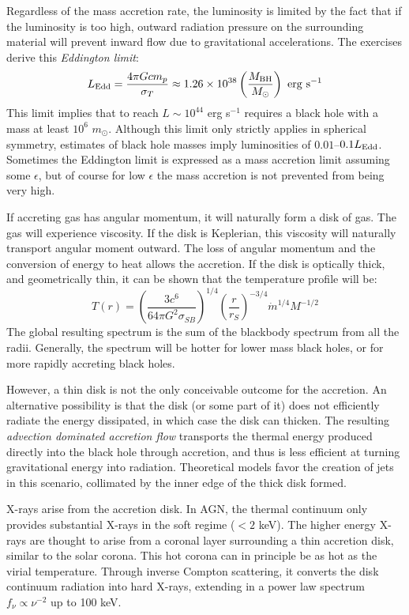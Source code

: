 Regardless of the mass accretion rate, the luminosity is limited by
the fact that if the luminosity is too high, outward radiation
pressure on the surrounding material will prevent inward flow due to
gravitational accelerations. The exercises derive this {\it Eddington
  limit}:
\begin{equation}
L_{\rm Edd} = \frac{4\pi G c m_p}{\sigma_T} \approx 1.26 \times
10^{38} \left(\frac{M_{\rm BH}}{M_\odot}\right) \mathrm{~erg~s}^{-1}
\end{equation}
This limit implies that to reach $L\sim 10^{44}$ erg s$^{-1}$ requires
a black hole with a mass at least $10^6$ $m_\odot$. Although this
limit only strictly applies in spherical symmetry, estimates of black
hole masses imply luminosities of $0.01$--$0.1 L_{\rm Edd}$. Sometimes
the Eddington limit is expressed as a mass accretion limit assuming
some $\epsilon$, but of course for low $\epsilon$ the mass accretion
is not prevented from being very high.

If accreting gas has angular momentum, it will naturally form a disk
of gas. The gas will experience viscosity. If the disk is Keplerian,
this viscosity will naturally transport angular moment outward. The
loss of angular momentum and the conversion of energy to heat allows
the accretion. If the disk is optically thick, and geometrically thin,
it can be shown that the temperature profile will be:
\begin{equation}
  T(r) = \left(\frac{3 c^6}{64\pi G^2 \sigma_{SB}}\right)^{1/4}
    \left(\frac{r}{r_S}\right)^{-3/4} {\dot m}^{1/4} M^{-1/2}
\end{equation}
The global resulting spectrum is the sum of the blackbody spectrum
from all the radii. Generally, the spectrum will be hotter for lower
mass black holes, or for more rapidly accreting black holes.

However, a thin disk is not the only conceivable outcome for the
accretion. An alternative possibility is that the disk (or some part
of it) does not efficiently radiate the energy dissipated, in which
case the disk can thicken. The resulting {\it advection dominated
  accretion flow} transports the thermal energy produced directly into
the black hole through accretion, and thus is less efficient at
turning gravitational energy into radiation. Theoretical models favor
the creation of jets in this scenario, collimated by the inner edge of
the thick disk formed. 

X-rays arise from the accretion disk. In AGN, the thermal continuum
only provides substantial X-rays in the soft regime ($<2$ keV). The
higher energy X-rays are thought to arise from a coronal layer
surrounding a thin accretion disk, similar to the solar corona. This
hot corona can in principle be as hot as the virial
temperature. Through inverse Compton scattering, it converts the disk
continuum radiation into hard X-rays, extending in a power law
spectrum $f_\nu \propto \nu^{-2}$ up to 100 keV.

